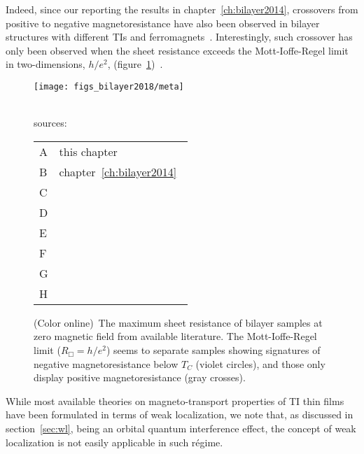 Indeed, since our reporting the results in chapter~\ref{ch:bilayer2014}, crossovers from positive to negative magnetoresistance have also been observed in bilayer structures with different TIs and ferromagnets~\cite{Samarth2017, Tian2016}. Interestingly, such crossover has only been observed when the sheet resistance exceeds the Mott-Ioffe-Regel limit in two-dimensions, $h/e^2$, (figure~\ref{fig:bilayer2018_wl_trend})~\cite{mott_book, Fradkin1986b}.%
%
\begin{figure}[ht]%
    \centering
    \texttt{[image: figs\_bilayer2018/meta]}%
    \hfill%
    \begin{minipage}[t]{0.32\columnwidth}%
        ~\\
        sources:\\
        \begin{tabular}[t]{l l}
            A & this chapter~\cite{bilayer2018}\\
            B & chapter~\ref{ch:bilayer2014}~\cite{bilayer2014}\\
            C & \citeauthor{Samarth2017}~\citeyear{Samarth2017}~\cite{Samarth2017}\\
            D & \citeauthor{Shi2014}~\citeyear{Shi2014}~\cite{Shi2014}\\
            E & \citeauthor{Petta2014}~\citeyear{Petta2014}~\cite{Petta2014}\\
            F & \citeauthor{Wang2014}~\citeyear{Wang2014}~\cite{Wang2014}\\
            G & \citeauthor{Tian2016}~\citeyear{Tian2016}~\cite{Tian2016}\\
            H & \citeauthor{Qiu2017}~\citeyear{Qiu2017}~\cite{Qiu2017}\\
        \end{tabular}
    \end{minipage}%
    \caption[Sheet resistance and signatures of negative magnetoresistance in TI-ferromagnet bilayers reported in literature]{\label{fig:bilayer2018_wl_trend}(Color online)~The maximum sheet resistance of bilayer samples at zero magnetic field from available literature. The Mott-Ioffe-Regel limit ($R_\Box = h/e^2$) seems to separate samples showing signatures of negative magnetoresistance below $T_C$ (violet circles), and those only display positive magnetoresistance (gray crosses).}%
\end{figure} %
While most available theories on magneto-transport properties of TI thin films have been formulated in terms of weak localization, we note that, as discussed in section~\ref{sec:wl}, being an orbital quantum interference effect, the concept of weak localization is not easily applicable in such r\'egime.

